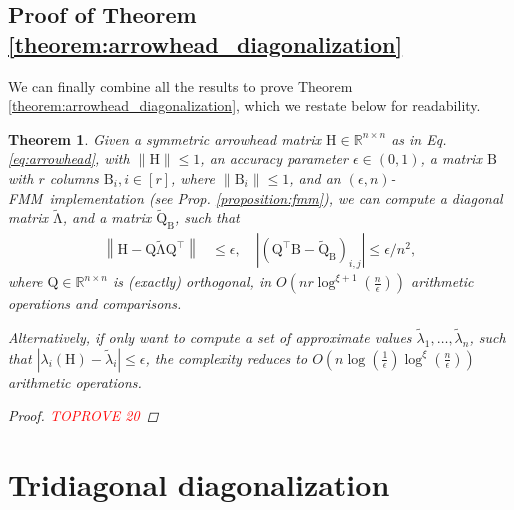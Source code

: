 \documentclass{article}
\newcommand{\labs}{\left|}
\newcommand{\rabs}{\right|}
\newcommand{\lnorm}{\left\|}
\newcommand{\rnorm}{\right\|}
\newcommand{\lpar}{\left(}
\newcommand{\rpar}{\right)}
\newtheorem{theorem}{Theorem}[section]
\newcommand\matB{\boldsymbol{\mathrm{B}}}
\newcommand\matH{\boldsymbol{\mathrm{H}}}
\newcommand\matQ{\boldsymbol{\mathrm{Q}}}
\newcommand\matQtilde{\widetilde{\boldsymbol{\mathrm{Q}}}}
\newcommand\matLambdatilde{\widetilde{\boldsymbol{\mathrm{\Lambda}}}}
\newcommand{\cfmm}{\xi}
\newcommand{\fmmalgo}{FMM} \usepackage[utf8]{inputenc}
\begin{document}
\subsection{Proof of Theorem \ref{theorem:arrowhead_diagonalization}}
We can finally combine all the results to prove Theorem \ref{theorem:arrowhead_diagonalization}, which we restate below for readability.
\begin{theorem}
    \label{theorem:arrowhead_diagonalization_appendix}
    Given a symmetric arrowhead matrix $\matH\in\mathbb{R}^{n\times n}$ as in Eq. \eqref{eq:arrowhead}, with $\|\matH\|\leq 1$, an accuracy parameter $\epsilon\in(0,1)$, a matrix $\matB$ with $r$ columns $\matB_i,i\in[r]$, where $\|\matB_i\|\leq 1$, and an $(\epsilon,n)$-\fmmalgo\   implementation (see Prop. \ref{proposition:fmm}), we can compute a diagonal matrix $\matLambdatilde$, and a matrix
    $\matQtilde_{\matB}$, such that 
    \begin{align*}
        \lnorm \matH-\matQ\matLambdatilde\matQ^\top \rnorm &\leq \epsilon,
        \quad
        \labs \lpar \matQ^\top\matB - \matQtilde_{\matB} \rpar_{i,j}\rabs \leq  \epsilon/n^2,
    \end{align*}
    where 
    $
        \matQ\in\mathbb{R}^{n\times n}
    $ is (exactly) orthogonal, in 
    $
        O\lpar nr\log^{\cfmm+1}(\tfrac{n}{\epsilon})\rpar
    $
    arithmetic operations and comparisons.

    Alternatively, if only want to compute a set of approximate values $\widetilde\lambda_1,\ldots,\widetilde\lambda_n$, such that $|\lambda_i(\matH)-\widetilde\lambda_i|\leq \epsilon$, the complexity reduces to $O\lpar n\log(\frac{1}{\epsilon})\log^{\cfmm}(\frac{n}{\epsilon})\rpar$ arithmetic operations.
    \begin{proof}\textcolor{red}{TOPROVE 20}\end{proof}
\end{theorem}


\section{Tridiagonal diagonalization}
\label{appendix:tridiagonal_diagonalization}
\end{document}
